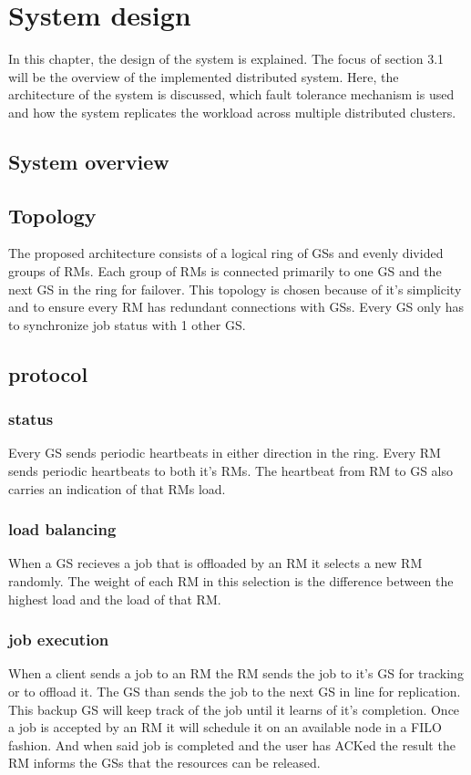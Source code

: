 \section{System design}
In this chapter, the design of the system is explained.
The focus of section 3.1 will be the overview of the implemented distributed system.
Here, the architecture of the system is discussed, which fault tolerance mechanism is used and how the system replicates the workload across multiple distributed clusters.

\subsection{System overview}


\subsection{Topology}
The proposed architecture consists of a logical ring of GSs and evenly divided groups of RMs.
Each group of RMs is connected primarily to one GS and the next GS in the ring for failover.
This topology is chosen because of it's simplicity and to ensure every RM has redundant connections with GSs.
Every GS only has to synchronize job status with 1 other GS.

\subsection{protocol}

\subsubsection{status}
Every GS sends periodic heartbeats in either direction in the ring. %
Every RM sends periodic heartbeats to both it's RMs.
The heartbeat from RM to GS also carries an indication of that RMs load.

\subsubsection{load balancing}
When a GS recieves a job that is offloaded by an RM it selects a new RM randomly.
The weight of each RM in this selection is the difference between the
highest load and the load of that RM.

\subsubsection{job execution}
When a client sends a job to an RM the RM sends the job to it's GS for tracking or to offload it.
The GS than sends the job to the next GS in line for replication.
This backup GS will keep track of the job until it learns of it's completion.
Once a job is accepted by an RM it will schedule it on an available node in a FILO fashion.
And when said job is completed and the user has ACKed the result the RM informs the GSs that the resources can be released.

